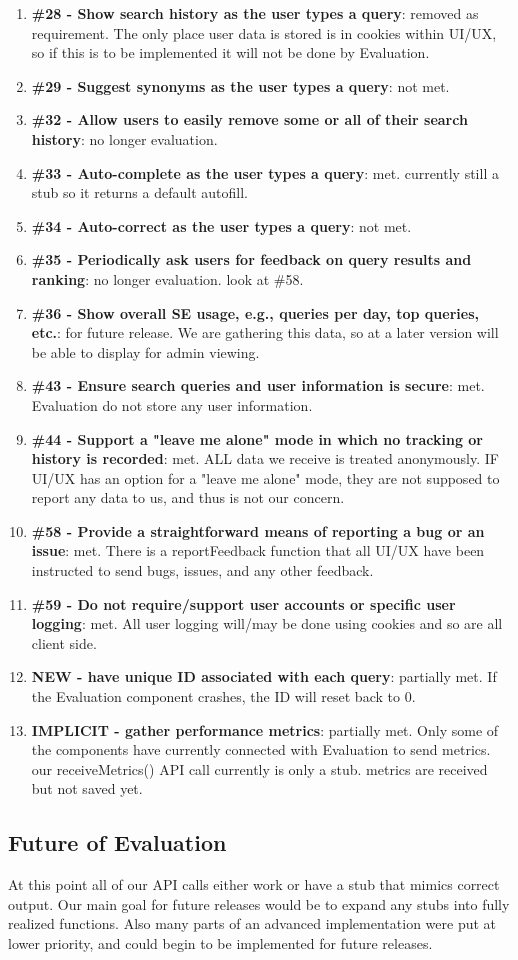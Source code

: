 \begin{enumerate}
\item \textbf{\#28 - Show search history as the user types a query}: removed as requirement. The only place user data is stored is in cookies within UI/UX, so if this is to be implemented it will not be done by Evaluation. 
\item \textbf{\#29 - Suggest synonyms as the user types a query}: not met. 
\item \textbf{\#32 - Allow users to easily remove some or all of their search history}: no longer evaluation.
\item \textbf{\#33 - Auto-complete as the user types a query}: met. currently still a stub so it returns a default autofill.
\item \textbf{\#34 - Auto-correct as the user types a query}: not met.
\item \textbf{\#35 - Periodically ask users for feedback on query results and ranking}: no longer evaluation. look at \#58.
\item \textbf{\#36 - Show overall SE usage, e.g., queries per day, top queries, etc.}: for future release. We are gathering this data, so at a later version will be able to display for admin viewing.
\item \textbf{\#43 - Ensure search queries and user information is secure}: met. Evaluation do not store any user information.
\item \textbf{\#44 - Support a "leave me alone" mode in which no tracking or history is recorded}: met. ALL data we receive is treated anonymously. IF UI/UX has an option for a "leave me alone" mode, they are not supposed to report any data to us, and thus is not our concern.
\item \textbf{\#58 - Provide a straightforward means of reporting a bug or an issue}: met. There is a reportFeedback function that all UI/UX have been instructed to send bugs, issues, and any other feedback. 
\item \textbf{\#59 - Do not require/support user accounts or specific user logging}: met. All user logging will/may be done using cookies and so are all client side.
\item \textbf{NEW - have unique ID associated with each query}: partially met. If the Evaluation component crashes, the ID will reset back to 0.
\item \textbf{IMPLICIT - gather performance metrics}: partially met. Only some of the components have currently connected with Evaluation to send metrics. our receiveMetrics() API call currently is only a stub. metrics are received but not saved yet. 
\end{enumerate}

\subsection*{Future of Evaluation}
At this point all of our API calls either work or have a stub that mimics correct output. Our main goal for future releases would be to expand any stubs into fully realized functions. Also many parts of an advanced implementation were put at lower priority, and could begin to be implemented for future releases. 